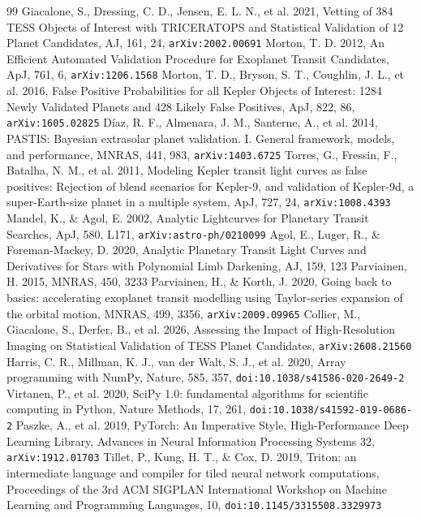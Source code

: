 \documentclass[11pt]{article}
\begin{document}
\begin{thebibliography}{99}
 Giacalone, S., Dressing, C. D., Jensen, E. L. N., et al. 2021, Vetting of 384 TESS Objects of Interest with TRICERATOPS and Statistical Validation of 12 Planet Candidates, AJ, 161, 24, \texttt{arXiv:2002.00691}
 Morton, T. D. 2012, An Efficient Automated Validation Procedure for Exoplanet Transit Candidates, ApJ, 761, 6, \texttt{arXiv:1206.1568}
 Morton, T. D., Bryson, S. T., Coughlin, J. L., et al. 2016, False Positive Probabilities for all Kepler Objects of Interest: 1284 Newly Validated Planets and 428 Likely False Positives, ApJ, 822, 86, \texttt{arXiv:1605.02825}
 D\'iaz, R. F., Almenara, J. M., Santerne, A., et al. 2014, PASTIS: Bayesian extrasolar planet validation. I. General framework, models, and performance, MNRAS, 441, 983, \texttt{arXiv:1403.6725}
 Torres, G., Fressin, F., Batalha, N. M., et al. 2011, Modeling Kepler transit light curves as false positives: Rejection of blend scenarios for Kepler-9, and validation of Kepler-9d, a super-Earth-size planet in a multiple system, ApJ, 727, 24, \texttt{arXiv:1008.4393}
 Mandel, K., \& Agol, E. 2002, Analytic Lightcurves for Planetary Transit Searches, ApJ, 580, L171, \texttt{arXiv:astro-ph/0210099}
 Agol, E., Luger, R., \& Foreman-Mackey, D. 2020, Analytic Planetary Transit Light Curves and Derivatives for Stars with Polynomial Limb Darkening, AJ, 159, 123
 Parviainen, H. 2015, MNRAS, 450, 3233
 Parviainen, H., \& Korth, J. 2020, Going back to basics: accelerating exoplanet transit modelling using Taylor-series expansion of the orbital motion, MNRAS, 499, 3356, \texttt{arXiv:2009.09965}
 Collier, M., Giacalone, S., Derfer, B., et al. 2026, Assessing the Impact of High-Resolution Imaging on Statistical Validation of TESS Planet Candidates, \texttt{arXiv:2608.21560}
 Harris, C. R., Millman, K. J., van der Walt, S. J., et al. 2020, Array programming with NumPy, Nature, 585, 357, \texttt{doi:10.1038/s41586-020-2649-2}
 Virtanen, P., et al. 2020, SciPy 1.0: fundamental algorithms for scientific computing in Python, Nature Methods, 17, 261, \texttt{doi:10.1038/s41592-019-0686-2}
 Paszke, A., et al. 2019, PyTorch: An Imperative Style, High-Performance Deep Learning Library, Advances in Neural Information Processing Systems 32, \texttt{arXiv:1912.01703}
 Tillet, P., Kung, H. T., \& Cox, D. 2019, Triton: an intermediate language and compiler for tiled neural network computations, Proceedings of the 3rd ACM SIGPLAN International Workshop on Machine Learning and Programming Languages, 10, \texttt{doi:10.1145/3315508.3329973}

\end{thebibliography}
\end{document}
